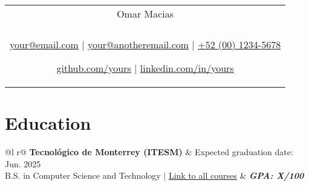 \documentclass[a4paper,8pt]{article}
\begin{document}
\pagestyle{empty} 


\begin{tabularx}{\linewidth}{@{} C @{}}
\color[HTML]{1C033C} \Huge{Omar Macias} \\[6pt]
\\
\textcolor[HTML]{371e77}{\underline{\href{mailto:your@email.com}{\raisebox{-0.05\height}{\faEnvelope} your@email.com}} $|$}
\textcolor[HTML]{371e77}{\underline{\href{mailto:your@anotheremail.com}{\raisebox{-0.05\height}{\faEnvelope} your@anotheremail.com}} $|$}
\textcolor[HTML]{371e77}{\href{tel:+525513219900}{\raisebox{-0.05\height}{\faMobile} +52 (00) 1234-5678}}

\textcolor[HTML]{371e77}{\underline{\href{https://github.com/yours}{\raisebox{-0.05\height}{\faGithub} github.com/yours}} $|$}
\textcolor[HTML]{371e77}{\underline{\href{https://linkedin.com/in/yours}{\raisebox{-0.05\height}{\faLinkedin} linkedin.com/in/yours}}}
\end{tabularx}

\section{Education}
\begin{tabularx}{\linewidth}{ @{}l r@{} }
\color[HTML]{1C033C} \textbf{Tecnológico de Monterrey (ITESM)} & \hfill \color[HTML]{371e77} Expected graduation date: Jun. 2025 \\
\color[HTML]{371e77} B.S. in Computer Science and Technology $|$ {\uline{\href{https://linktoyourcarrer.site}{Link to all courses}}} & \hfill \color[HTML]{4B28A4} \textit{\textbf{GPA: X/100}} \\
\end{tabularx}


\end{document}
